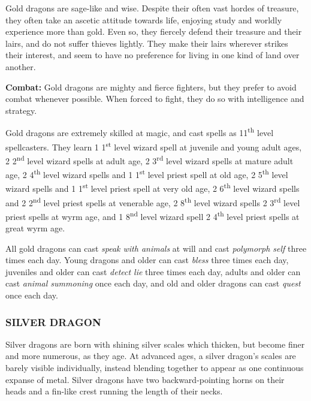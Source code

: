 \begin{multicols}{2}
Gold dragons are sage-like and wise. Despite their often vast hordes of treasure, they often take an ascetic attitude towards life, enjoying study and worldly experience more than gold. Even so, they fiercely defend their treasure and their lairs, and do not suffer thieves lightly. They make their lairs wherever strikes their interest, and seem to have no preference for living in one kind of land over another.

\textbf{Combat:} Gold dragons are mighty and fierce fighters, but they prefer to avoid combat whenever possible. When forced to fight, they do so with intelligence and strategy.

Gold dragons are extremely skilled at magic, and cast spells as 11\textsuperscript{th} level spellcasters. They learn 1 1\textsuperscript{st} level wizard spell at juvenile and young adult ages, 2 2\textsuperscript{nd} level wizard spells at adult age, 2 3\textsuperscript{rd} level wizard spells at mature adult age, 2 4\textsuperscript{th} level wizard spells and 1 1\textsuperscript{st} level priest spell at old age, 2 5\textsuperscript{th} level wizard spells and 1 1\textsuperscript{st} level priest spell at very old age, 2 6\textsuperscript{th} level wizard spells and 2 2\textsuperscript{nd} level priest spells at venerable age, 2 8\textsuperscript{th} level wizard spells 2 3\textsuperscript{rd} level priest spells at wyrm age, and 1 8\textsuperscript{nd} level wizard spell 2 4\textsuperscript{th} level priest spells at great wyrm age.

All gold dragons can cast \textit{speak with animals} at will and cast \textit{polymorph self} three times each day. Young dragons and older can cast \textit{bless} three times each day, juveniles and older can cast \textit{detect lie} three times each day, adults and older can cast \textit{animal summoning} once each day, and old and older dragons can cast \textit{quest} once each day.

\subsubsection{SILVER DRAGON}

Silver dragons are born with shining silver scales which thicken, but become finer and more numerous, as they age. At advanced ages, a silver dragon's scales are barely visible individually, instead blending together to appear as one continuous expanse of metal. Silver dragons have two backward-pointing horns on their heads and a fin-like crest running the length of their necks.


\end{multicols}
